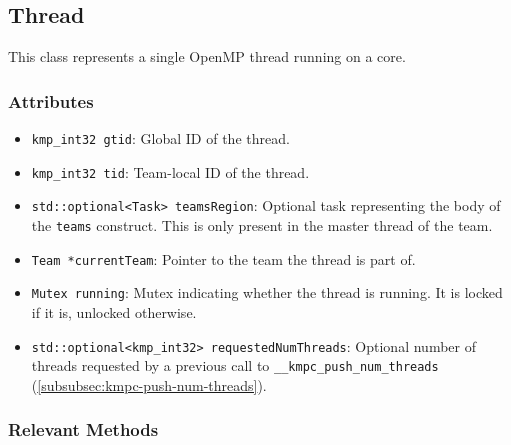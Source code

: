 \subsection{Thread}

This class represents a single OpenMP thread running on a core.

\subsubsection{Attributes}

\begin{itemize}
	\item \texttt{kmp_int32 gtid}: Global ID of the thread.
	\item \texttt{kmp_int32 tid}: Team-local ID of the thread.
	\item \texttt{std::optional<Task> teamsRegion}: Optional task representing the body of the
	      \texttt{teams} construct. This is only present in the master thread of the team.
	\item \texttt{Team *currentTeam}: Pointer to the team the thread is part of.
	\item \texttt{Mutex running}: Mutex indicating whether the thread is running. It is locked if it
	      is, unlocked otherwise. 
	\item \texttt{std::optional<kmp_int32> requestedNumThreads}: Optional number of threads requested
	      by a previous call to \texttt{__kmpc_push_num_threads} (\cref{subsubsec:kmpc-push-num-threads}).
\end{itemize}

\subsubsection{Relevant Methods}

